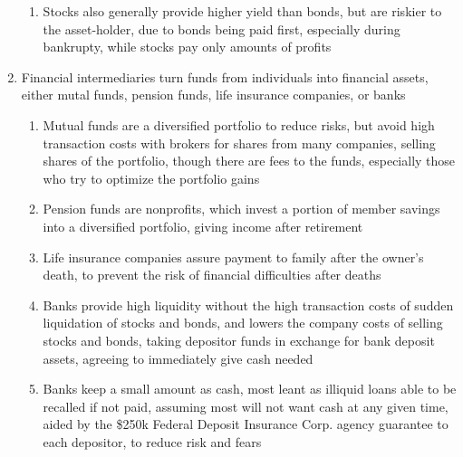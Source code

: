 \begin{enumerate}
\begin{enumerate}
\item Stocks also generally provide higher yield than bonds, but are riskier to the asset-holder, due to bonds being paid first, especially during bankrupty,  while stocks pay only amounts of profits
\end{enumerate}
\item Financial intermediaries turn funds from individuals into financial assets, either mutal funds, pension funds, life insurance companies, or banks
\begin{enumerate}
\item Mutual funds are a diversified portfolio to reduce risks, but avoid high transaction costs with brokers for shares from many companies, selling shares of the portfolio, though there are fees to the funds, especially those who try to optimize the portfolio gains
\item Pension funds are nonprofits, which invest a portion of member savings into a diversified portfolio, giving income after retirement
\item Life insurance companies assure payment to family after the owner's death, to prevent the risk of financial difficulties after deaths
\item Banks provide high liquidity without the high transaction costs of sudden liquidation of stocks and bonds, and lowers the company costs of selling stocks and bonds, taking depositor funds in exchange for bank deposit assets, agreeing to immediately give cash needed
\item Banks keep a small amount as cash, most leant as illiquid loans able to be recalled if not paid, assuming most will not want cash at any given time, aided by the \$250k Federal Deposit Insurance Corp. agency guarantee to each depositor, to reduce risk and fears
\end{enumerate}
\end{enumerate}

